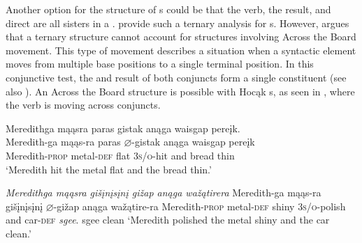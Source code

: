 \documentclass[output=paper]{LSP/langsci}
\begin{document}
 
Another option for the structure of s could be that the verb, the result, and direct  are all sisters in a .  \citet{Carrier1992} provide such a ternary analysis for  s. However, \citet{Bowers1997} argues that a ternary structure cannot account for structures involving Across the Board movement. This type of movement describes a situation when a syntactic element moves from multiple base positions to a single terminal position. In this conjunctive test, the  and result of both conjuncts form a single constituent (see also \citealt{Li1999}). An Across the Board structure is possible with Hocąk s, as seen in , where the verb is moving across conjuncts.
 

\begin{exe}
\ex\label{ex:rosen:26}
\begin{xlist}

\ex \glll Meredithga mąąsra paras gistak anąga waisgap pereįk. \\
Meredith-ga mąąs-ra paras {$\varnothing$}-gistak anąga waisgap pereįk\\
Meredith-\textsc{prop} metal-\textsc{def} flat \textsc{3s/o}-hit and bread thin\\
\glt `Meredith hit the metal flat and the bread thin.'

\ex \textit{Meredithga \hspace{1.58em} mąąsra \hspace{.9em} gišįnį{s}įnį \hspace{.1em}gižap  \hspace {2.4em} anąga wažątirera}  \newline Meredith-ga \hspace{1.18em} mąąs-ra \hspace {.5em} gišįnį{s}įnį {$\varnothing$}-gižap \hspace{1.3em} anąga wažątire-ra \newline Meredith-\textsc{prop} metal-\textsc{def} shiny \hspace{1.6em} \textsc{3s/o}-polish and \hspace{1em} car-\textsc{def} \newline\textit{sgee}. \newline
sgee \newline
clean \newline
`Meredith polished the metal shiny and the car clean.'

\end{xlist}
\end{exe}
 
\end{document}
